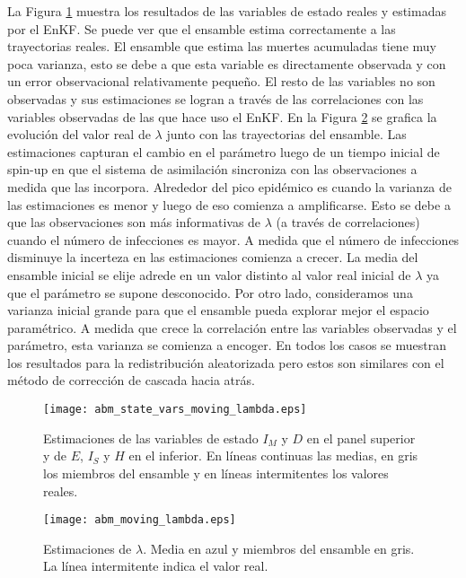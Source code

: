 La Figura \ref{fig:abm_state_vars_moving_lambda} muestra los resultados de las variables de estado reales y estimadas por el EnKF. Se puede ver que el ensamble estima correctamente a las trayectorias reales. El ensamble que estima las muertes acumuladas tiene muy poca varianza, esto se debe a que esta variable es directamente observada y con un error observacional relativamente pequeño. El resto de las variables no son observadas y sus estimaciones se logran a través de las correlaciones con las variables observadas de las que hace uso el EnKF. En la Figura \ref{fig:abm_moving_lambda} se grafica la evolución del valor real de $\lambda$ junto con las trayectorias del ensamble. Las estimaciones capturan el cambio en el parámetro luego de un tiempo inicial de spin-up en que el sistema de asimilación sincroniza con las observaciones a medida que las incorpora. Alrededor del pico epidémico es cuando la varianza de las estimaciones es menor y luego de eso comienza a amplificarse. Esto se debe a que las observaciones son más informativas de $\lambda$ (a través de correlaciones) cuando el número de infecciones es mayor. A medida que el número de infecciones disminuye la incerteza en las estimaciones comienza a crecer. La media del ensamble inicial se elije adrede en un valor distinto al valor real inicial de $\lambda$ ya que el parámetro se supone desconocido. Por otro lado, consideramos una varianza inicial grande para que el ensamble pueda explorar mejor el espacio paramétrico. A medida que crece la correlación entre las variables observadas y el parámetro, esta varianza se comienza a encoger. En todos los casos se muestran los resultados para la redistribución aleatorizada pero estos son similares con el método de corrección de cascada hacia atrás.
\begin{figure}[h]
    \centering
    \texttt{[image: abm\_state\_vars\_moving\_lambda.eps]}
    \caption{Estimaciones de las variables de estado $I_M$ y $D$ en el panel superior y de $E$, $I_S$ y $H$ en el inferior. En líneas continuas las medias, en gris los miembros del ensamble y en líneas intermitentes los valores reales.}
    \label{fig:abm_state_vars_moving_lambda}
\end{figure}
\begin{figure}[h]
    \centering
    \texttt{[image: abm\_moving\_lambda.eps]}
    \caption{Estimaciones de $\lambda$. Media en azul y miembros del ensamble en gris. La línea intermitente indica el valor real.}
    \label{fig:abm_moving_lambda}
\end{figure}

